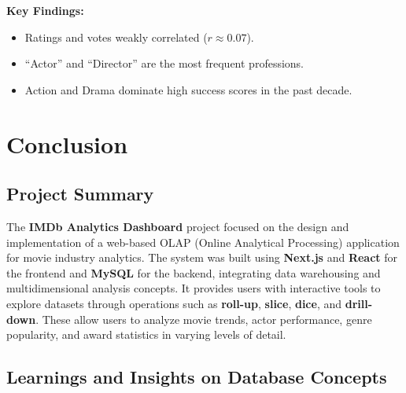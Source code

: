 \documentclass[sigconf, pbalance]{acmart}
\begin{document}
\textbf{Key Findings:}
\begin{itemize}
    \item Ratings and votes weakly correlated ($r \approx 0.07$).
    \item ``Actor'' and ``Director'' are the most frequent professions.
    \item Action and Drama dominate high success scores in the past decade.
\end{itemize}

\section{Conclusion}

\subsection{Project Summary}
The \textbf{IMDb Analytics Dashboard} project focused on the design and implementation of a web-based OLAP (Online Analytical Processing) application for movie industry analytics. The system was built using \textbf{Next.js} and \textbf{React} for the frontend and \textbf{MySQL} for the backend, integrating data warehousing and multidimensional analysis concepts. It provides users with interactive tools to explore datasets through operations such as \textbf{roll-up}, \textbf{slice}, \textbf{dice}, and \textbf{drill-down}. These allow users to analyze movie trends, actor performance, genre popularity, and award statistics in varying levels of detail. 

\subsection{Learnings and Insights on Database Concepts}
\end{document}
